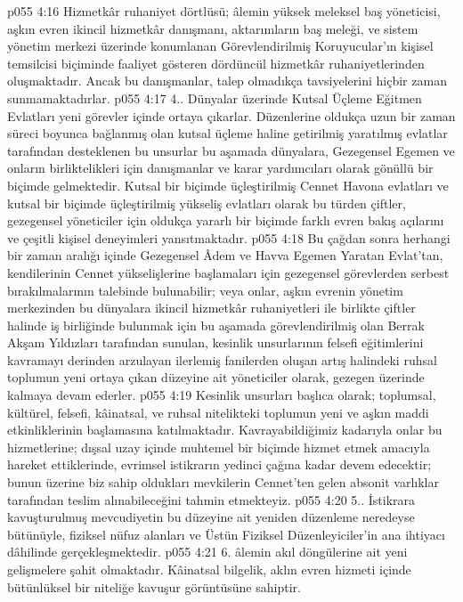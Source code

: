 \vs p055 4:16 Hizmetkâr ruhaniyet dörtlüsü; âlemin yüksek meleksel baş yöneticisi, aşkın evren ikincil hizmetkâr danışmanı, aktarımların baş meleği, ve sistem yönetim merkezi üzerinde konumlanan Görevlendirilmiş Koruyucular’ın kişisel temsilcisi biçiminde faaliyet gösteren dördüncül hizmetkâr ruhaniyetlerinden oluşmaktadır. Ancak bu danışmanlar, talep olmadıkça tavsiyelerini hiçbir zaman sunmamaktadırlar.
\vs p055 4:17 4.\bibnobreakspace {}. Dünyalar üzerinde Kutsal Üçleme Eğitmen Evlatları yeni görevler içinde ortaya çıkarlar. Düzenlerine oldukça uzun bir zaman süreci boyunca bağlanmış olan kutsal üçleme haline getirilmiş yaratılmış evlatlar tarafından desteklenen bu unsurlar bu aşamada dünyalara, Gezegensel Egemen ve onların birliktelikleri için danışmanlar ve karar yardımcıları olarak gönüllü bir biçimde gelmektedir. Kutsal bir biçimde üçleştirilmiş Cennet Havona evlatları ve kutsal bir biçimde üçleştirilmiş yükseliş evlatları olarak bu türden çiftler, gezegensel yöneticiler için oldukça yararlı bir biçimde farklı evren bakış açılarını ve çeşitli kişisel deneyimleri yansıtmaktadır.
\vs p055 4:18 Bu çağdan sonra herhangi bir zaman aralığı içinde Gezegensel Âdem ve Havva Egemen Yaratan Evlat’tan, kendilerinin Cennet yükselişlerine başlamaları için gezegensel görevlerden serbest bırakılmalarının talebinde bulunabilir; veya onlar, aşkın evrenin yönetim merkezinden bu dünyalara ikincil hizmetkâr ruhaniyetleri ile birlikte çiftler halinde iş birliğinde bulunmak için bu aşamada görevlendirilmiş olan Berrak Akşam Yıldızları tarafından sunulan, kesinlik unsurlarının felsefi eğitimlerini kavramayı derinden arzulayan ilerlemiş fanilerden oluşan artış halindeki ruhsal toplumun yeni ortaya çıkan düzeyine ait yöneticiler olarak, gezegen üzerinde kalmaya devam ederler.
\vs p055 4:19 Kesinlik unsurları başlıca olarak; toplumsal, kültürel, felsefi, kâinatsal, ve ruhsal nitelikteki toplumun yeni ve aşkın maddi etkinliklerinin başlamasına katılmaktadır. Kavrayabildiğimiz kadarıyla onlar bu hizmetlerine; dışsal uzay içinde muhtemel bir biçimde hizmet etmek amacıyla hareket ettiklerinde, evrimsel istikrarın yedinci çağına kadar devem edecektir; bunun üzerine biz sahip oldukları mevkilerin Cennet’ten gelen absonit varlıklar tarafından teslim alınabileceğini tahmin etmekteyiz.
\vs p055 4:20 5.. İstikrara kavuşturulmuş mevcudiyetin bu düzeyine ait yeniden düzenleme neredeyse bütünüyle, fiziksel nüfuz alanları ve Üstün Fiziksel Düzenleyiciler’in ana ihtiyacı dâhilinde gerçekleşmektedir.
\vs p055 4:21 6.\bibnobreakspace {} âlemin akıl döngülerine ait yeni gelişmelere şahit olmaktadır. Kâinatsal bilgelik, aklın evren hizmeti içinde bütünlüksel bir niteliğe kavuşur görüntüsüne sahiptir.
